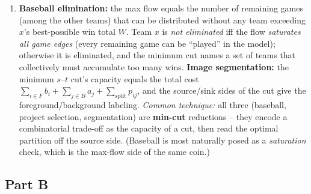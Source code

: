 \documentclass[11pt]{article}
\begin{document}
\begin{enumerate}[label=\textbf{A\arabic*.}, leftmargin=2.2em]
\item \textbf{Baseball elimination:} the max flow equals the number of remaining
games (among the other teams) that can be distributed without any team exceeding
$x$'s best-possible win total $W$. Team $x$ is \emph{not eliminated} iff the flow
\emph{saturates all game edges} (every remaining game can be ``played'' in the
model); otherwise it is eliminated, and the minimum cut names a set of teams that
collectively must accumulate too many wins. \textbf{Image segmentation:} the
minimum $s$--$t$ cut's capacity equals the total cost
$\sum_{i\in F} b_i + \sum_{j \in B} a_j + \sum_{\text{split}} p_{ij}$, and the
source/sink sides of the cut give the foreground/background labeling.
\emph{Common technique:} all three (baseball, project selection, segmentation)
are \textbf{min-cut} reductions -- they encode a combinatorial trade-off as the
capacity of a cut, then read the optimal partition off the source side. (Baseball
is most naturally posed as a \emph{saturation} check, which is the max-flow side
of the same coin.)

\end{enumerate}

\subsection*{Part B}
\end{document}

